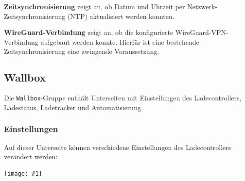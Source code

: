 \documentclass[a4paper,10pt]{article}
\newcommand{\gfx}[1]{\texttt{[image: \#1]}}
\begin{document}
\begin{multicols*}{2}
    \textbf{Zeitsynchronisierung} zeigt an, ob Datum und Uhrzeit per Netzwerk-Zeitsynchronisierung (NTP) aktualisiert werden konnten.

    \textbf{WireGuard-Verbindung} zeigt an, ob die konfigurierte WireGuard-VPN-Verbindung aufgebaut werden konnte. Hierfür ist eine bestehende Zeitsynchronisierung eine zwingende Voraussetzung.

    \subsection{Wallbox}
    Die \texttt{Wallbox}-Gruppe enthält Unterseiten mit Einstellungen des
	Ladecontrollers, Ladestatus, Ladetracker und Automatisierung.

    \subsubsection{Einstellungen}\label{evse-settings}

    Auf dieser Unterseite können verschiedene Einstellungen des Ladecontrollers verändert werden:

    \gfx{./img_warp3/resized/web_evse_settings}


\end{multicols*}
\end{document}

